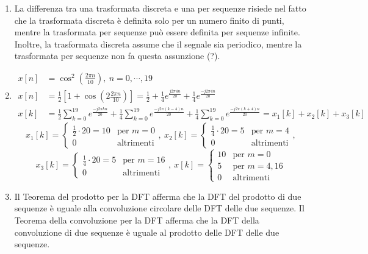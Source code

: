 \documentclass[
]{article}
\begin{document}
\begin{enumerate}
\def\labelenumi{\arabic{enumi}.}
\setcounter{enumi}{22}
\item
  La differenza tra una trasformata discreta e una per sequenze risiede
  nel fatto che la trasformata discreta è definita solo per un numero
  finito di punti, mentre la trasformata per sequenze può essere
  definita per sequenze infinite. Inoltre, la trasformata discreta
  assume che il segnale sia periodico, mentre la trasformata per
  sequenze non fa questa assunzione (?).
\item
  \begin{align*} 
  x[n] &= \cos^2(\frac{2\pi n}{10}), \ n= 0, \cdots, 19 \\
  x[n] &= \frac{1}{2}[1+\cos(2\frac{2\pi n}{10})] = \frac{1}{2} + \frac{1}{4}e^{\frac{j2\pi 4n}{20}} + \frac{1}{4}e^{\frac{-j2\pi 4n}{20}} \\
  x[k] &= \frac{1}{2}\sum_{k=0}^{19} e^{\frac{-j2\pi kn}{20}} + \frac{1}{4}\sum_{k=0}^{19} e^{\frac{-j2\pi (k-4)n}{20}} +\frac{1}{4}\sum_{k=0}^{19} e^{\frac{-j2\pi (k+4)n}{20}} = x_1[k]+x_2[k]+x_3[k]
  \end{align*} \[
  x_{1}[k] = \left\{ \begin{array}{cl}
  \frac{1}{2} \cdot 20 = 10 & \text{per } m=0 \\
  0 & \text{altrimenti}
  \end{array} \right., \
  x_{2}[k] = \left\{ \begin{array}{cl}
  \frac{1}{4} \cdot 20 = 5& \text{per } m=4 \\
  0 & \text{altrimenti}
  \end{array} \right.,
  \] \[
  x_{3}[k] = \left\{ \begin{array}{cl}
  \frac{1}{4} \cdot 20 = 5& \text{per } m=16 \\
  0 & \text{altrimenti}
  \end{array} \right.,\
  x[k] = \left\{ \begin{array}{cl}
  10& \text{per } m=0 \\
  5 & \text{per }m=4, 16\\
  0 & \text{altrimenti}
  \end{array} \right.
  \]
\item
  Il Teorema del prodotto per la DFT afferma che la DFT del prodotto di
  due sequenze è uguale alla convoluzione circolare delle DFT delle due
  sequenze. Il Teorema della convoluzione per la DFT afferma che la DFT
  della convoluzione di due sequenze è uguale al prodotto delle DFT
  delle due sequenze.

\end{enumerate}
\end{document}
